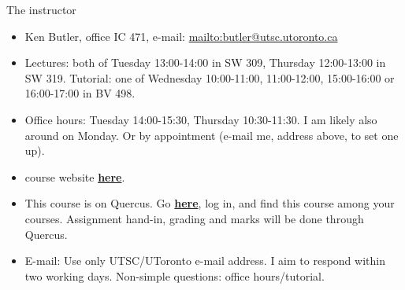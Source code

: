 \documentclass[ignorenonframetext,]{beamer}
\providecommand{\tightlist}{%
  \setlength{\itemsep}{0pt}\setlength{\parskip}{0pt}}
\begin{document}
\begin{frame}{The instructor}
\protect\hypertarget{the-instructor}{}

\begin{itemize}
\tightlist
\item
  Ken Butler, office IC 471, e-mail:
  \url{mailto:butler@utsc.utoronto.ca}
\item
  Lectures: both of Tuesday 13:00-14:00 in SW 309, Thursday 12:00-13:00
  in SW 319. Tutorial: one of Wednesday 10:00-11:00, 11:00-12:00,
  15:00-16:00 or 16:00-17:00 in BV 498.
\item
  Office hours: Tuesday 14:00-15:30, Thursday 10:30-11:30. I am likely
  also around on Monday. Or by appointment (e-mail me, address above, to
  set one up).
\item
  course website \href{http://ritsokiguess.site/STAC32}{\textbf{here}}.
\item
  This course is on Quercus. Go
  \href{http://q.utoronto.ca}{\textbf{here}}, log in, and find this
  course among your courses. Assignment hand-in, grading and marks will
  be done through Quercus.
\item
  E-mail: Use only UTSC/UToronto e-mail address. I aim to respond within
  two working days. Non-simple questions: office hours/tutorial.
\end{itemize}

\end{frame}
\end{document}
